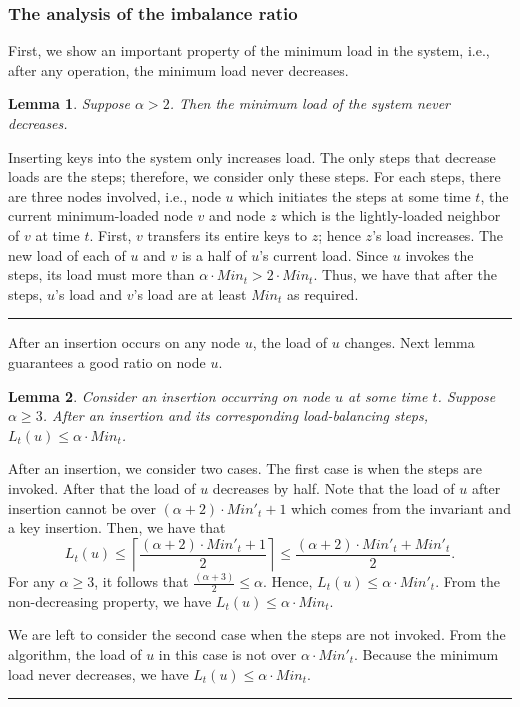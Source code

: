 \documentclass[a4paper]{article}
\newtheorem{lemma}{Lemma}
\newenvironment{proof}{{\bf Proof:}}{\hfill\rule{1.5mm}{3mm}\vspace{0.1in}}
\newcommand{\qed}{}
\begin{document}
\subsubsection{The analysis of the imbalance ratio}
First, we show an important property of the minimum load in
the system, i.e., after any operation, the minimum load never
decreases.
\begin{lemma}
\label{lem:minload_not_decrease} 
Suppose $\alpha > 2$. Then the minimum load of the system never decreases.
\end{lemma}

\begin{proof}
  Inserting keys into the system only increases load.  The only steps
  that decrease loads are the  {\minbalance} steps; therefore, we
  consider only these steps.  For each {\minbalance} steps, there are
  three nodes involved, i.e., node $u$ which initiates the 
  {\minbalance} steps at some time $t$, the current minimum-loaded
  node $v$ and node $z$ which is the lightly-loaded neighbor of $v$ at
  time $t$.  First, $v$ transfers its entire keys to $z$; hence $z$'s
  load increases.  The new load of each of $u$ and $v$ is a half of
  $u$'s current load.  Since $u$ invokes the  {\minbalance} steps, its
  load must more than $\alpha\cdot Min_t > 2\cdot Min_t$.  Thus, we
  have that after the steps, $u$'s load and $v$'s load are at least $Min_t$
  as required. \qed
\end{proof}

After an insertion occurs on any node $u$, the load of $u$  changes.
Next lemma guarantees a good ratio on node $u$.

\begin{lemma}
\label{lem:insert-property} 
Consider an insertion occurring on node $u$ at some time $t$.  Suppose
$\alpha\geq 3$. After an insertion and its corresponding
load-balancing steps, $L_t(u)\leq \alpha \cdot Min_t$.
\end{lemma}

\begin{proof}
  After an insertion, we consider two cases.  The first case is when the
  {\minbalance} steps are invoked. After that the load of $u$ decreases by half. 
  Note that the load of $u$ after insertion cannot be over
  $(\alpha+2)\cdot Min'_t+1$ which comes from the invariant and a key
  insertion. Then, we have that
  \[L_t(u)\leq\left\lceil\frac{(\alpha+2)\cdot
      Min'_t+1}{2}\right\rceil\leq\frac{(\alpha+2)\cdot
    Min'_t+Min'_t}{2}.\]  
  For any $\alpha\geq 3$, it follows that $\frac{(\alpha+3)}{2}\leq\alpha$. 
  Hence, $L_t(u)\leq \alpha\cdot Min'_t$.
  From the non-decreasing property, we have $L_t(u)\leq \alpha\cdot Min_t$.
  
  We are left to consider the second case when the {\minbalance} steps
  are not invoked.  From the algorithm, the load of $u$ in this case
  is not over $\alpha\cdot Min'_t$.  Because the minimum load never
  decreases, we have $L_t(u)\leq \alpha\cdot Min_t$.
\end{proof}
\end{document}
